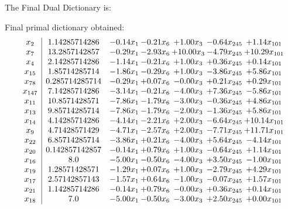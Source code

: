 \documentclass[8pt]{article}
\begin{document}
The Final Dual Dictionary is: 

 Final primal dictionary obtained: 
\[\begin{array}{c| c c@{\hskip 2pt} c@{\hskip 2pt} c@{\hskip 2pt} c@{\hskip 2pt} c@{\hskip 2pt} }
 x_{2}   &  1.14285714286 & -0.14 x_{1} & -0.21 x_{6} & +  1.00 x_{3} & -0.64 x_{245} & +  1.14 x_{101}\\
 x_{7}   &  13.2857142857 & -0.29 x_{1} & -2.93 x_{6} & + 10.00 x_{3} & -4.79 x_{245} & + 10.29 x_{101}\\
 x_{4}   &  2.14285714286 & -1.14 x_{1} & -0.21 x_{6} & +  1.00 x_{3} & +  0.36 x_{245} & +  0.14 x_{101}\\
 x_{15}   &  1.85714285714 & -1.86 x_{1} & -0.29 x_{6} & +  1.00 x_{3} & -3.86 x_{245} & +  5.86 x_{101}\\
 x_{78}   &  0.285714285714 & -0.29 x_{1} & +  0.07 x_{6} & -0.00 x_{3} & +  0.21 x_{245} & +  0.29 x_{101}\\
 x_{147}   &  7.14285714286 & -3.14 x_{1} & -0.21 x_{6} & -4.00 x_{3} & +  7.36 x_{245} & -5.86 x_{101}\\
 x_{11}   &  10.8571428571 & -7.86 x_{1} & -1.79 x_{6} & -3.00 x_{3} & -0.36 x_{245} & +  4.86 x_{101}\\
 x_{13}   &  9.85714285714 & -7.86 x_{1} & -1.79 x_{6} & -2.00 x_{3} & -1.36 x_{245} & +  5.86 x_{101}\\
 x_{14}   &  4.14285714286 & -4.14 x_{1} & -2.21 x_{6} & +  2.00 x_{3} & -6.64 x_{245} & + 10.14 x_{101}\\
 x_{9}   &  4.71428571429 & -4.71 x_{1} & -2.57 x_{6} & +  2.00 x_{3} & -7.71 x_{245} & + 11.71 x_{101}\\
 x_{22}   &  6.85714285714 & -3.86 x_{1} & +  0.21 x_{6} & -4.00 x_{3} & +  5.64 x_{245} & -4.14 x_{101}\\
 x_{20}   &  0.142857142857 & -0.14 x_{1} & +  0.79 x_{6} & +  1.00 x_{3} & -0.64 x_{245} & +  1.14 x_{101}\\
 x_{16}   &  8.0 & -5.00 x_{1} & -0.50 x_{6} & -4.00 x_{3} & +  3.50 x_{245} & -1.00 x_{101}\\
 x_{19}   &  1.28571428571 & -1.29 x_{1} & +  0.07 x_{6} & +  1.00 x_{3} & -2.79 x_{245} & +  4.29 x_{101}\\
 x_{17}   &  2.57142857143 & -1.57 x_{1} & +  0.64 x_{6} & -1.00 x_{3} & -0.07 x_{245} & +  1.57 x_{101}\\
 x_{21}   &  1.14285714286 & -0.14 x_{1} & +  0.79 x_{6} & -0.00 x_{3} & +  0.36 x_{245} & +  0.14 x_{101}\\
 x_{18}   &  7.0 & -5.00 x_{1} & -0.50 x_{6} & -3.00 x_{3} & +  2.50 x_{245} & +  0.00 x_{101}\\

\end{array}\]
\end{document}
